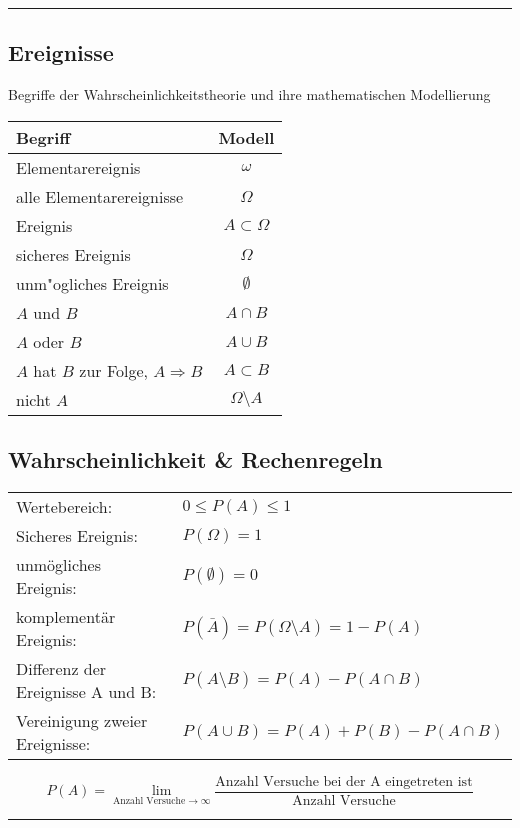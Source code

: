 \hrule
\vspace{.5cm}
\begin{minipage}[t]{6.5cm}
\subsection{Ereignisse \skript{\pageref{sk-section-begriffe}}}
Begriffe der Wahrscheinlichkeitstheorie und ihre mathematischen
Modellierung\\
\begin{tabular}{|l|c|}
\hline
Begriff&Modell\\
\hline
Elementarereignis&$\omega$\\
alle Elementarereignisse&$\Omega$\\
Ereignis&$A\subset\Omega$\\
sicheres Ereignis&$\Omega$\\
unm"ogliches Ereignis&$\emptyset$\\
$A$ und $B$&$A\cap B$\\
$A$ oder $B$&$A\cup B$\\
$A$ hat $B$ zur Folge, $A\Rightarrow B$&$A\subset B$\\
nicht $A$&$\Omega\setminus A$\\
\hline
\end{tabular}
\end{minipage}
\hspace{.5cm}
\begin{minipage}[t]{9cm}
\subsection{Wahrscheinlichkeit \& Rechenregeln \skript{\pageref{sk-begriffe-zusammenfassung}}}
\begin{tabular}{ll}
  Wertebereich: & ${0}\le{P(A)}\le{1}$\\
  Sicheres Ereignis:    & $P(\Omega)=1$\\
  unmögliches Ereignis: & $P(\emptyset)=0$\\
  komplementär Ereignis: & $P(\bar{A})=P({\Omega}\setminus{A})=1-P(A)$\\
  Differenz der Ereignisse A und B: & $P({A}\setminus{B})=P(A)-P({A}\cap{B})$\\
  Vereinigung zweier Ereignisse: & $P({A}\cup{B})=P(A)+P(B)-P({A}\cap{B})$\\
\end{tabular}

\[P(A)=\lim\limits_{\text{Anzahl Versuche} \to \infty} \dfrac{\text{Anzahl Versuche bei der A eingetreten ist}}{\text{Anzahl Versuche}}
\]
\end{minipage}
\vspace{.5cm}
\hrule

